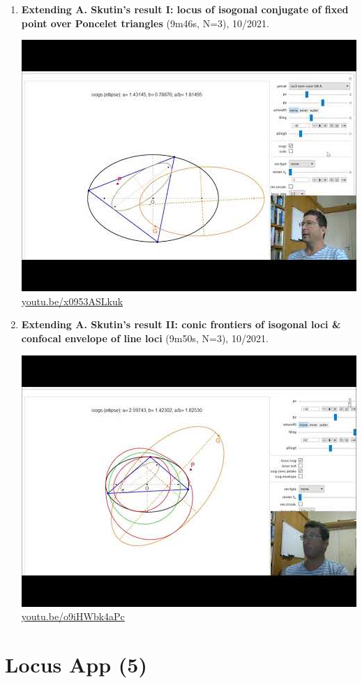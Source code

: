 \documentclass[12pt]{amsart}
\begin{document}
\begin{enumerate}[resume]
\item \textbf{Extending A. Skutin's result I: locus of isogonal conjugate of fixed point over Poncelet triangles} (9m46s, N=3), 10/2021. 
\begin{center}\includegraphics[width=.5\textwidth]{pics/x0953ASLkuk.jpg} \\ 
\href{https://youtu.be/x0953ASLkuk}{\url{youtu.be/x0953ASLkuk}}\end{center}
% 
\item \textbf{Extending A. Skutin's result II: conic frontiers of isogonal loci \& confocal envelope of line loci} (9m50s, N=3), 10/2021. 
\begin{center}\includegraphics[width=.5\textwidth]{pics/o9iHWbk4aPc.jpg} \\ 
\href{https://youtu.be/o9iHWbk4aPc}{\url{youtu.be/o9iHWbk4aPc}}\end{center}
% 
\end{enumerate}

\section{Locus App (5)}
\end{document}
